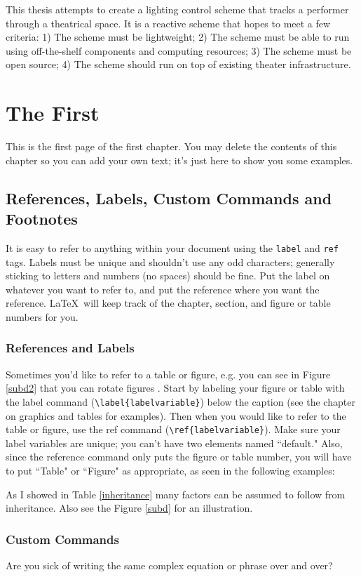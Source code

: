 \documentclass[12pt,twoside]{reedthesis}
\begin{document}
    This thesis attempts to create a lighting control scheme that tracks a performer through a theatrical space. It is a reactive scheme that hopes to meet a few criteria: 1) The scheme must be lightweight; 2) The scheme must be able to run using off-the-shelf components and computing resources; 3) The scheme must be open source; 4) The scheme should run on top of existing theater infrastructure. 
	
    \chapter{The First}
    	This is the first page of the first chapter. You may delete the contents of this chapter so you can add your own text; it's just here to show you some examples. 
	
\section{References, Labels, Custom Commands and Footnotes}
It is easy to refer to anything within your document using the \texttt{label} and \texttt{ref} tags.  Labels must be unique and shouldn't use any odd characters; generally sticking to letters and numbers (no spaces) should be fine. Put the label on whatever you want to refer to, and put the reference where you want the reference. \LaTeX\ will keep track of the chapter, section, and figure or table numbers for you. 

\subsection{References and Labels}
Sometimes you'd like to refer to a table or figure, e.g. you can see in Figure \ref{subd2} that you can rotate figures . Start by labeling your figure or table with the label command (\verb=\label{labelvariable}=) below the caption (see the chapter on graphics and tables for examples). Then when you would like to refer to the table or figure, use the ref command (\verb=\ref{labelvariable}=). Make sure your label variables are unique; you can't have two elements named ``default." Also, since the reference command only puts the figure or table number, you will have to put  ``Table" or ``Figure" as appropriate, as seen in the following examples:

 As I showed in Table \ref{inheritance} many factors can be assumed to follow from inheritance. Also see the Figure \ref{subd} for an illustration.
 
\subsection{Custom Commands}\label{commands}
Are you sick of writing the same complex equation or phrase over and over? 
\end{document}
